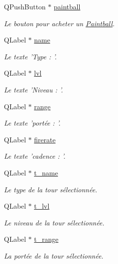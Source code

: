 \begin{DoxyCompactItemize}
QPushButton $\ast$ \hyperlink{classUI_a39fd06f53449fb6382de26d280be2e5f}{paintball}
\begin{DoxyCompactList}\small\item\em Le bouton pour acheter un \hyperlink{classPaintball}{Paintball}. \end{DoxyCompactList}\item 
QLabel $\ast$ \hyperlink{classUI_a81ae571ef0c2c3044c1a5271887f5936}{name}
\begin{DoxyCompactList}\small\item\em Le texte 'Type : '. \end{DoxyCompactList}\item 
QLabel $\ast$ \hyperlink{classUI_a92e0870069d6ca6cd8b6dba91ec3702d}{lvl}
\begin{DoxyCompactList}\small\item\em Le texte 'Niveau : '. \end{DoxyCompactList}\item 
QLabel $\ast$ \hyperlink{classUI_aacb7c02b6a962b8adc8a7d4b6ffc1553}{range}
\begin{DoxyCompactList}\small\item\em Le texte 'portée : '. \end{DoxyCompactList}\item 
QLabel $\ast$ \hyperlink{classUI_a58bde2e8f6ca9d8f2fa32affefa02045}{firerate}
\begin{DoxyCompactList}\small\item\em Le texte 'cadence : '. \end{DoxyCompactList}\item 
QLabel $\ast$ \hyperlink{classUI_a161fc86882aacdd0577fc8e65ae7b9a5}{t\_\-name}
\begin{DoxyCompactList}\small\item\em Le type de la tour sélectionnée. \end{DoxyCompactList}\item 
QLabel $\ast$ \hyperlink{classUI_ad249255ec54bc26253e0c215852a8eac}{t\_\-lvl}
\begin{DoxyCompactList}\small\item\em Le niveau de la tour sélectionnée. \end{DoxyCompactList}\item 
QLabel $\ast$ \hyperlink{classUI_a46e8137a64e79962e0ba633d4feb341f}{t\_\-range}
\begin{DoxyCompactList}\small\item\em La portée de la tour sélectionnée. \end{DoxyCompactList}\item 

\end{DoxyCompactItemize}
